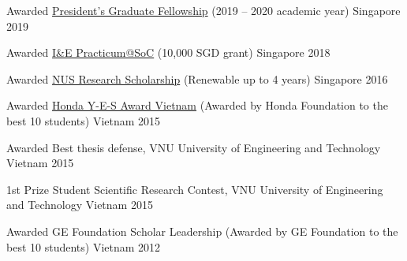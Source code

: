 
\begin{cvhonors}

\cvhonor
    {Awarded} %
    {\href{http://www.nus.edu.sg/admissions/graduate-studies/scholarships-financial-aid-and-fees/scholarships-awards/president's-graduate-fellowship.html}{President's Graduate Fellowship} (2019 -- 2020 academic year)} %
    {Singapore} %
    {2019} %


\cvhonor
    {Awarded} %
    {\href{https://www.comp.nus.edu.sg/entrepreneurship/awards/winners/}{I\&E Practicum@SoC} (10,000 SGD grant)} %
    {Singapore} %
    {2018} %


\cvhonor
    {Awarded} %
    {\href{http://www.nus.edu.sg/admissions/graduate-studies/scholarships-financial-aid-and-fees/scholarships-awards/nus-research-scholarship.html}{NUS Research Scholarship} (Renewable up to 4 years)} %
    {Singapore} %
    {2016} %

  \cvhonor
    {Awarded} %
    {\href{http://www.hondafoundation.jp/yes/index_en/184}{Honda Y-E-S Award Vietnam} (Awarded by Honda Foundation to the best 10 students)} %
    {Vietnam} %
    {2015} %

  \cvhonor
    {Awarded} %
    {Best thesis defense, VNU University of Engineering and Technology} %
    {Vietnam} %
    {2015} %

  \cvhonor
    {1st Prize} %
    {Student Scientific Research Contest, VNU University of Engineering and Technology} %
    {Vietnam} %
    {2015} %

  \cvhonor
    {Awarded} %
    {GE Foundation Scholar Leadership (Awarded by GE Foundation to the best 10 students)} %
    {Vietnam} %
    {2012} %

\end{cvhonors}


